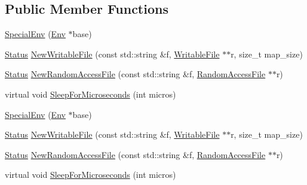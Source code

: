\subsection*{Public Member Functions}
\begin{DoxyCompactItemize}
\item 
\hyperlink{classleveldb_1_1_special_env_a29fed9502e35a1f9374e0f46f4bd1181}{Special\+Env} (\hyperlink{classleveldb_1_1_env}{Env} $\ast$base)
\item 
\hyperlink{classleveldb_1_1_status}{Status} \hyperlink{classleveldb_1_1_special_env_aa7bdbcf4af2ba94330ada903179692f1}{New\+Writable\+File} (const std\+::string \&f, \hyperlink{classleveldb_1_1_writable_file}{Writable\+File} $\ast$$\ast$r, size\+\_\+t map\+\_\+size)
\item 
\hyperlink{classleveldb_1_1_status}{Status} \hyperlink{classleveldb_1_1_special_env_ae04ba2b7b94753d805e316dbda74ec00}{New\+Random\+Access\+File} (const std\+::string \&f, \hyperlink{classleveldb_1_1_random_access_file}{Random\+Access\+File} $\ast$$\ast$r)
\item 
virtual void \hyperlink{classleveldb_1_1_special_env_afcceb315ff4d8a96805b71a41502da94}{Sleep\+For\+Microseconds} (int micros)
\item 
\hyperlink{classleveldb_1_1_special_env_a29fed9502e35a1f9374e0f46f4bd1181}{Special\+Env} (\hyperlink{classleveldb_1_1_env}{Env} $\ast$base)
\item 
\hyperlink{classleveldb_1_1_status}{Status} \hyperlink{classleveldb_1_1_special_env_aa7bdbcf4af2ba94330ada903179692f1}{New\+Writable\+File} (const std\+::string \&f, \hyperlink{classleveldb_1_1_writable_file}{Writable\+File} $\ast$$\ast$r, size\+\_\+t map\+\_\+size)
\item 
\hyperlink{classleveldb_1_1_status}{Status} \hyperlink{classleveldb_1_1_special_env_ae04ba2b7b94753d805e316dbda74ec00}{New\+Random\+Access\+File} (const std\+::string \&f, \hyperlink{classleveldb_1_1_random_access_file}{Random\+Access\+File} $\ast$$\ast$r)
\item 
virtual void \hyperlink{classleveldb_1_1_special_env_afcceb315ff4d8a96805b71a41502da94}{Sleep\+For\+Microseconds} (int micros)
\end{DoxyCompactItemize}
